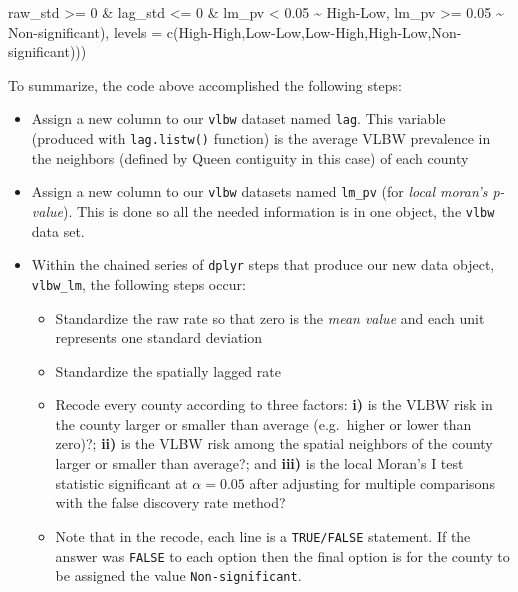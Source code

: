 \documentclass[
]{book}
\newenvironment{Shaded}{\begin{snugshade}}{\end{snugshade}}
\newcommand{\AttributeTok}[1]{\textcolor[rgb]{0.77,0.63,0.00}{#1}}
\newcommand{\DecValTok}[1]{\textcolor[rgb]{0.00,0.00,0.81}{#1}}
\newcommand{\FloatTok}[1]{\textcolor[rgb]{0.00,0.00,0.81}{#1}}
\newcommand{\FunctionTok}[1]{\textcolor[rgb]{0.00,0.00,0.00}{#1}}
\newcommand{\NormalTok}[1]{#1}
\newcommand{\SpecialCharTok}[1]{\textcolor[rgb]{0.00,0.00,0.00}{#1}}
\newcommand{\StringTok}[1]{\textcolor[rgb]{0.31,0.60,0.02}{#1}}
\providecommand{\tightlist}{%
  \setlength{\itemsep}{0pt}\setlength{\parskip}{0pt}}
\begin{document}
\begin{Shaded}
\begin{Highlighting}[]
\NormalTok{            raw\_std }\SpecialCharTok{\textgreater{}=} \DecValTok{0} \SpecialCharTok{\&}\NormalTok{ lag\_std }\SpecialCharTok{\textless{}=} \DecValTok{0} \SpecialCharTok{\&}\NormalTok{ lm\_pv }\SpecialCharTok{\textless{}} \FloatTok{0.05} \SpecialCharTok{\textasciitilde{}} \StringTok{\textquotesingle{}High{-}Low\textquotesingle{}}\NormalTok{,}
\NormalTok{            lm\_pv }\SpecialCharTok{\textgreater{}=} \FloatTok{0.05} \SpecialCharTok{\textasciitilde{}} \StringTok{\textquotesingle{}Non{-}significant\textquotesingle{}}\NormalTok{),}
           \AttributeTok{levels =} \FunctionTok{c}\NormalTok{(}\StringTok{\textquotesingle{}High{-}High\textquotesingle{}}\NormalTok{,}\StringTok{\textquotesingle{}Low{-}Low\textquotesingle{}}\NormalTok{,}\StringTok{\textquotesingle{}Low{-}High\textquotesingle{}}\NormalTok{,}\StringTok{\textquotesingle{}High{-}Low\textquotesingle{}}\NormalTok{,}\StringTok{\textquotesingle{}Non{-}significant\textquotesingle{}}\NormalTok{)))}
\end{Highlighting}
\end{Shaded}

To summarize, the code above accomplished the following steps:

\begin{itemize}
\tightlist
\item
  Assign a new column to our \texttt{vlbw} dataset named \texttt{lag}. This variable (produced with \texttt{lag.listw()} function) is the average VLBW prevalence in the neighbors (defined by Queen contiguity in this case) of each county
\item
  Assign a new column to our \texttt{vlbw} datasets named \texttt{lm\_pv} (for \emph{local moran's p-value}). This is done so all the needed information is in one object, the \texttt{vlbw} data set.
\item
  Within the chained series of \texttt{dplyr} steps that produce our new data object, \texttt{vlbw\_lm}, the following steps occur:

  \begin{itemize}
  \tightlist
  \item
    Standardize the raw rate so that zero is the \emph{mean value} and each unit represents one standard deviation
  \item
    Standardize the spatially lagged rate
  \item
    Recode every county according to three factors: \textbf{i)} is the VLBW risk in the county larger or smaller than average (e.g.~higher or lower than zero)?; \textbf{ii)} is the VLBW risk among the spatial neighbors of the county larger or smaller than average?; and \textbf{iii)} is the local Moran's I test statistic significant at \(\alpha = 0.05\) after adjusting for multiple comparisons with the false discovery rate method?
  \item
    Note that in the recode, each line is a \texttt{TRUE/FALSE} statement. If the answer was \texttt{FALSE} to each option then the final option is for the county to be assigned the value \texttt{\textquotesingle{}Non-significant\textquotesingle{}}.
  \end{itemize}
\end{itemize}
\end{document}
